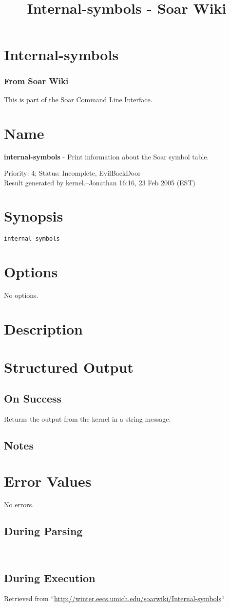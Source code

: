 \documentclass[10pt]{article}
\title{Internal-symbols - Soar Wiki}
\begin{document}
\section*{Internal-symbols}
\subsubsection*{From Soar Wiki}


 This is part of the Soar Command Line Interface. 
\section*{ Name }


 \textbf{internal-symbols}
 - Print information about the Soar symbol table. 


 Priority: 4; Status: Incomplete, EvilBackDoor\\ 
Result generated by kernel.--Jonathan 16:16, 23 Feb 2005 (EST) 
\section*{ Synopsis }
\begin{verbatim}
internal-symbols

\end{verbatim}
\section*{ Options }


 No options. 
\section*{ Description }
\section*{ Structured Output }
\subsection*{ On Success }


 Returns the output from the kernel in a string message. 
\subsection*{ Notes }
\section*{ Error Values }


 No errors. 
\subsection*{ During Parsing }


 \\ 

\subsection*{ During Execution }
 Retrieved from ``\url{http://winter.eecs.umich.edu/soarwiki/Internal-symbols}``
\end{document}
